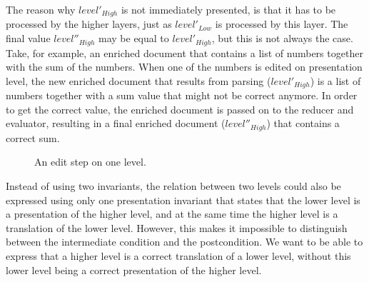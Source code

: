 The reason why $level'_{High}$ is not immediately presented, is that it has to be processed by the higher layers, just as $level'_{Low}$ is processed by this layer. The final value $level''_{High}$ may be equal to $level'_{High}$, but this is not always the case. Take, for example, an enriched document that contains a list of numbers together with the sum of the numbers. When one of the numbers is edited on presentation level, the new enriched document that results from parsing ($level'_{High}$) is a list of numbers together with a sum value that might not be correct anymore. In order to get the correct value, the enriched document is passed on to the reducer and evaluator, resulting in a final enriched document ($level''_{High}$) that contains a correct sum.

\begin{figure}
\begin{small}
\begin{center}
\begin{center}
\begin{small}
\bigskip \noindent
{}
\end{small}
\end{center}\caption{An edit step on one level.}\label{layerEditProcess} 
\end{center}
\end{small}
\end{figure}

Instead of using two invariants, the relation between two levels could also be expressed using only one presentation invariant that states that the lower level is a presentation of the higher level, and at the same time the higher level is a translation of the lower level. However, this makes it impossible to distinguish between the intermediate condition and the postcondition. We want to be able to express that a higher level is a correct translation of a lower level, without this lower level being a correct presentation of the higher level.

